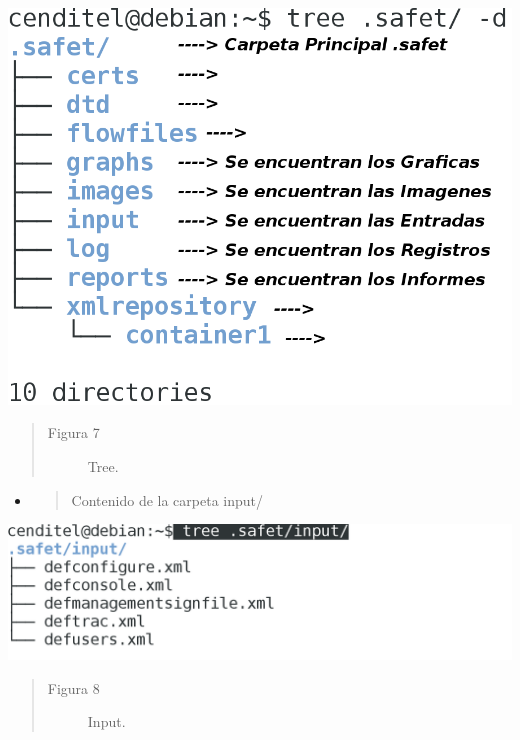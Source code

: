 \documentclass[letterpaper,11pt,spanish]{sphinxmanual}
\begin{document}
\includegraphics{listasafet.png}
\begin{quote}\begin{description}
\item[{Figura 7}] \leavevmode
Tree.

\end{description}\end{quote}
\begin{itemize}
\item {} \begin{quote}\begin{description}
\item[{Contenido de la carpeta input/}] \leavevmode
\end{description}\end{quote}

\end{itemize}

\includegraphics{input.png}
\begin{quote}\begin{description}
\item[{Figura 8}] \leavevmode
Input.

\end{description}\end{quote}
\end{document}
